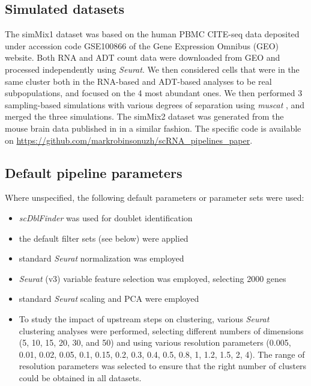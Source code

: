 \documentclass{bmcart}
\begin{document}
\subsection*{Simulated datasets}
The simMix1 dataset was based on the human PBMC CITE-seq data deposited under accession code GSE100866 of the Gene Expression Omnibus (GEO) website. Both RNA and ADT count data were downloaded from GEO and processed independently using \textit{Seurat}. We then considered cells that were in the same cluster both in the RNA-based and ADT-based analyses to be real subpopulations, and focused on the 4 most abundant ones. We then performed 3 sampling-based simulations with various degrees of separation using \textit{muscat} \citep{CrowellMuscat2019}, and merged the three simulations. The simMix2 dataset was generated from the mouse brain data published in \cite{CrowellMuscat2019} in a similar fashion. The specific code is available on \url{https://github.com/markrobinsonuzh/scRNA\_pipelines\_paper}.

\subsection*{Default pipeline parameters}

Where unspecified, the following default parameters or parameter sets were used:
\begin{itemize}
    \item \textit{scDblFinder} was used for doublet identification
    \item the default filter sets (see below) were applied
    \item standard \textit{Seurat} normalization was employed
    \item \textit{Seurat} (v3) variable feature selection was employed, selecting 2000 genes
    \item standard \textit{Seurat} scaling and PCA were employed
    \item To study the impact of upstream steps on clustering, various \textit{Seurat} clustering analyses were performed, selecting different numbers of dimensions (5, 10, 15, 20, 30, and 50) and using various resolution parameters (0.005, 0.01, 0.02, 0.05, 0.1, 0.15, 0.2, 0.3, 0.4, 0.5, 0.8, 1, 1.2, 1.5, 2, 4). The range of resolution parameters was selected to ensure that the right number of clusters could be obtained in all datasets.
\end{itemize}
\end{document}
